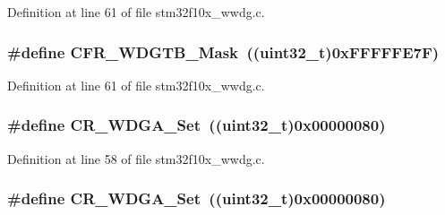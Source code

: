 Definition at line 61 of file stm32f10x\+\_\+wwdg.\+c.

\subsubsection[{\texorpdfstring{C\+F\+R\+\_\+\+W\+D\+G\+T\+B\+\_\+\+Mask}{CFR_WDGTB_Mask}}]{\setlength{\rightskip}{0pt plus 5cm}\#define C\+F\+R\+\_\+\+W\+D\+G\+T\+B\+\_\+\+Mask~(({\bf uint32\+\_\+t})0x\+F\+F\+F\+F\+F\+E7\+F)}\hypertarget{group___w_w_d_g___private___defines_ga2b74f53d33f15b272b2d1ef78a78a2cc}{}\label{group___w_w_d_g___private___defines_ga2b74f53d33f15b272b2d1ef78a78a2cc}


Definition at line 61 of file stm32f10x\+\_\+wwdg.\+c.

\subsubsection[{\texorpdfstring{C\+R\+\_\+\+W\+D\+G\+A\+\_\+\+Set}{CR_WDGA_Set}}]{\setlength{\rightskip}{0pt plus 5cm}\#define C\+R\+\_\+\+W\+D\+G\+A\+\_\+\+Set~(({\bf uint32\+\_\+t})0x00000080)}\hypertarget{group___w_w_d_g___private___defines_ga4c66a66daa0e09782e8b2248db9b35f6}{}\label{group___w_w_d_g___private___defines_ga4c66a66daa0e09782e8b2248db9b35f6}


Definition at line 58 of file stm32f10x\+\_\+wwdg.\+c.

\subsubsection[{\texorpdfstring{C\+R\+\_\+\+W\+D\+G\+A\+\_\+\+Set}{CR_WDGA_Set}}]{\setlength{\rightskip}{0pt plus 5cm}\#define C\+R\+\_\+\+W\+D\+G\+A\+\_\+\+Set~(({\bf uint32\+\_\+t})0x00000080)}\hypertarget{group___w_w_d_g___private___defines_ga4c66a66daa0e09782e8b2248db9b35f6}{}\label{group___w_w_d_g___private___defines_ga4c66a66daa0e09782e8b2248db9b35f6}


